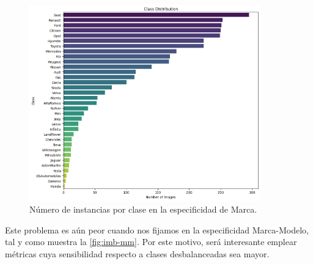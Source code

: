 \begin{figure}[H]
	\centering
	\includegraphics[width=100mm]{img/imbalance-marca.png}
	\caption{Número de instancias por clase en la especificidad de Marca.}
	\label{fig:imb-m}
\end{figure}

Este problema es aún peor cuando nos fijamos en la especificidad Marca-Modelo, tal y como muestra la \autoref{fig:imb-mm}. Por este motivo, será interesante emplear métricas cuya sensibilidad respecto a clases desbalanceadas sea mayor.

